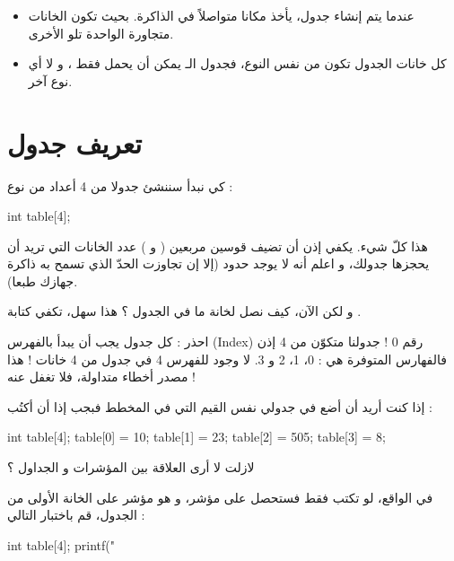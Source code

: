 \begin{itemize}
  \item عندما يتم إنشاء جدول، يأخذ مكانا متواصلاً في الذاكرة. بحيث تكون الخانات متجاورة الواحدة تلو الأخرى.
  \item كل خانات الجدول تكون من نفس النوع، فجدول
الـ
يمكن أن يحمل فقط
،
و لا أي نوع آخر.
\end{itemize}

\section{تعريف جدول}

كي نبدأ سننشئ جدولا من 4 أعداد من نوع
 :

\begin{Csource}
int table[4];
\end{Csource}

هذا كلّ شيء. يكفي إذن أن تضيف قوسين مربعين
(\InlineCode{[}
و
\InlineCode{]})
عدد الخانات التي تريد أن يحجزها جدولك، و اعلم أنه لا يوجد حدود (إلا إن تجاوزت الحدّ الذي تسمح به ذاكرة جهازك طبعا).

و لكن الآن، كيف نصل لخانة ما في الجدول ؟
هذا سهل، تكفي كتابة
.

\begin{critical}
 احذر : كل جدول يجب أن يبدأ بالفهرس
(\textenglish{Index})
رقم 0 ! جدولنا متكوّن من 4
إذن فالفهارس المتوفرة هي : 0، 1، 2 و 3. لا وجود للفهرس 4 في جدول من 4 خانات ! هذا مصدر أخطاء متداولة، فلا تغفل عنه !

\end{critical}

إذا كنت أريد أن أضع في جدولي نفس القيم التي في المخطط فبجب إذا أن أكتُب :

\begin{Csource}
int table[4];
table[0] = 10;
table[1] = 23;
table[2] = 505;
table[3] = 8;
\end{Csource}

\begin{question}
  لازلت لا أرى العلاقة بين المؤشرات و الجداول ؟
\end{question}

في الواقع، لو تكتب فقط
فستحصل على مؤشر، و هو مؤشر على الخانة الأولى من الجدول، قم باختبار التالي :

\begin{Csource}
int table[4];
printf("%
\end{Csource}

